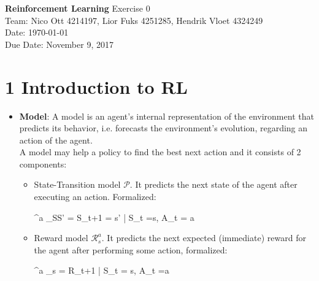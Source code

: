 \documentclass[a4paper, 11pt]{article}
\begin{document}
\noindent
\large\textbf{Reinforcement Learning} \hfill %
\normalsize Exercise 0 \hfill 
\\Team: Nico Ott 4214197, Lior Fuks 4251285, Hendrik Vloet 4324249 \\
\hfill Date: \today \\
\hfill Due Date: November 9, 2017
\section*{1 Introduction to RL}
\begin{itemize}
	\item \textbf{Model}: A model is an agent's internal representation of the environment that predicts its behavior, i.e. forecasts the environment's evolution, regarding an action of the agent.\\
	 A model may help a policy to find the best next action and it consists of 2 components:
	\begin{itemize}
		\item State-Transition model $\mathcal{P}$. It predicts the next state of the agent after executing an action. Formalized:
		\begin{flalign*}
			^a _{SS'} =   \left\lbrace S_{t+1}   = s' | S_t =s, A_t = a    \right\rbrace \\
		\end{flalign*}
		\item Reward model $\mathcal{R}^a _s$. It predicts the next expected (immediate) reward for the agent after performing some action, formalized:
		\begin{flalign*}
			^a _s =  \lbrace R_{t+1} | S_t = s, A_t =a \rbrace \\
		\end{flalign*}

\end{itemize}
\end{itemize}
\end{document}
